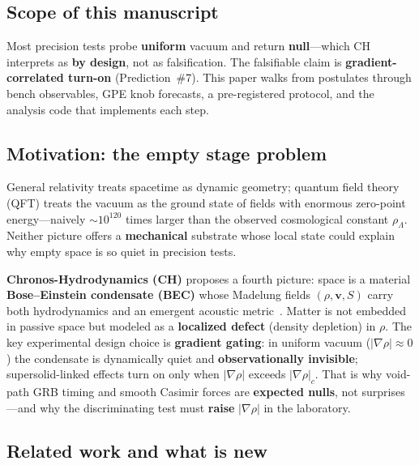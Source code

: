 \documentclass[11pt,a4paper]{article}
\begin{document}
\subsection{Scope of this manuscript}

Most precision tests probe \textbf{uniform} vacuum and return \textbf{null}---which CH interprets as \textbf{by design}, not as falsification.
The falsifiable claim is \textbf{gradient-correlated turn-on} (Prediction~\#7).
This paper walks from postulates through bench observables, GPE knob forecasts, a pre-registered protocol, and the analysis code that implements each step.

\subsection{Motivation: the empty stage problem}

General relativity treats spacetime as dynamic geometry; quantum field theory (QFT) treats the vacuum as the ground state of fields with enormous zero-point energy---naively $\sim 10^{120}$ times larger than the observed cosmological constant $\rho_\Lambda$.
Neither picture offers a \textbf{mechanical} substrate whose local state could explain why empty space is so quiet in precision tests.

\textbf{Chronos-Hydrodynamics (CH)} proposes a fourth picture: space is a material \textbf{Bose--Einstein condensate (BEC)} whose Madelung fields $(\rho, \mathbf{v}, S)$ carry both hydrodynamics and an emergent acoustic metric~\cite{Unruh1981,Visser1995,Volovik2003}.
Matter is not embedded in passive space but modeled as a \textbf{localized defect} (density depletion) in $\rho$.
The key experimental design choice is \textbf{gradient gating}: in uniform vacuum ($|\nabla\rho| \approx 0$) the condensate is dynamically quiet and \textbf{observationally invisible}; supersolid-linked effects turn on only when $|\nabla\rho|$ exceeds $|\nabla\rho|_c$.
That is why void-path GRB timing and smooth Casimir forces are \textbf{expected nulls}, not surprises---and why the discriminating test must \textbf{raise} $|\nabla\rho|$ in the laboratory.

\subsection{Related work and what is new}
\end{document}
